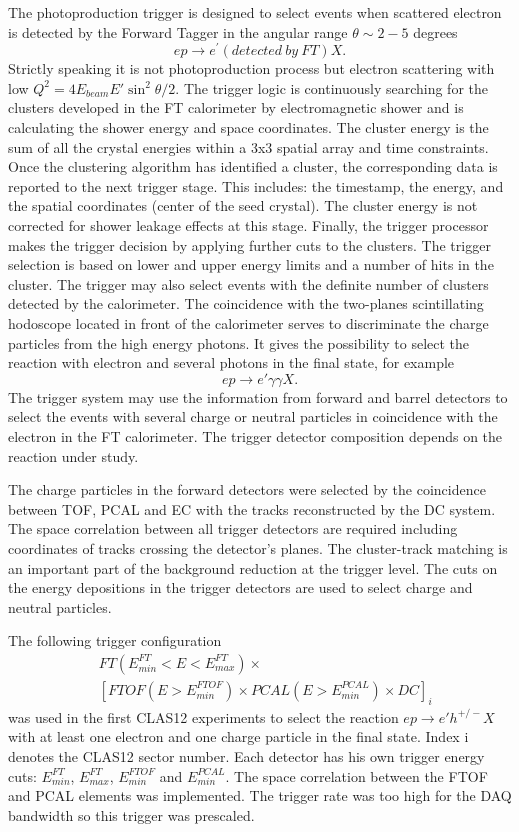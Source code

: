 The photoproduction trigger is designed to select  events when scattered electron is detected by the Forward Tagger in the angular range $\theta\sim2-5$ degrees
$$
e p  \rightarrow e^\prime(detected\ by\ FT) X.
$$
\noindent
Strictly speaking it is not photoproduction process but electron scattering with  low $Q^2=4E_{beam}E'\sin^2\theta/2$.
The trigger logic is continuously searching for the clusters developed in the FT calorimeter by electromagnetic shower and is calculating the shower energy and space coordinates. 
The cluster energy is the sum of all the
crystal energies within a 3x3 spatial array and time constraints. Once
the clustering algorithm  has identified a cluster, the
corresponding data is reported to the next trigger stage. This
includes: the timestamp, the energy, and the spatial coordinates (center
of the seed crystal). The cluster energy is not corrected for shower
leakage effects at this stage. Finally, the trigger processor makes the
trigger decision by applying further cuts to the clusters. The trigger  selection is based on lower and upper energy limits and a number of hits in the cluster. The trigger may also select events with the definite number of clusters detected by the calorimeter. 
The coincidence with the two-planes  scintillating hodoscope   located in front of the calorimeter serves to discriminate the charge particles from the high energy photons. 
It gives the possibility to select the reaction with electron and several photons in the final state, for example
$$
ep\to e'\gamma\gamma X.
$$
\noindent
The trigger system may use the  information from forward and barrel detectors to select the events with several charge or neutral particles in coincidence with the electron in the FT calorimeter. The trigger detector composition depends on the reaction under study. 

The charge particles in the forward detectors  were selected by the coincidence between TOF, PCAL and EC with the tracks reconstructed by the DC system. The space correlation between all trigger detectors are required including coordinates 
 of tracks crossing the detector's planes. The cluster-track matching is an important part of the background reduction at the trigger level. The cuts on the energy depositions in the trigger detectors are used to select charge and neutral particles. 
 
 The following trigger configuration 
 \begin{align*} 
 &FT(E^{FT}_{min}{<}E{<}E^{FT}_{max})\times\\
 & [FTOF(E{>}E^{FTOF}_{min})\times PCAL(E{>}E^{PCAL}_{min})\times  DC]_i
\end{align*}
  was used in the first CLAS12 experiments to select the reaction $ep\to e'h^{+/-}X$
 with at least one electron and one charge particle in the final state. Index i denotes the CLAS12 sector number. 
 Each detector has his own trigger energy cuts: $ E^{FT}_{min}$,  $E^{FT}_{max}$, $E^{FTOF}_{min}$ and $E^{PCAL}_{min}$.
 The space correlation between the FTOF and PCAL elements was implemented.
 The trigger rate was too high for the DAQ bandwidth so this trigger was prescaled. 

